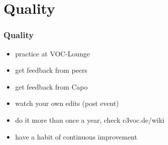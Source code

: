 \documentclass[hyperref={pdfpagelabels=false}]{beamer}
\begin{document}
\begin{frame}
\end{frame}

\section{Quality} 
\begin{frame}
\frametitle{Quality}
\begin{itemize}[<+->]
\item  practice at VOC-Lounge %
\item  get feedback from peers %
\item  get feedback from Capo %
\item  watch your own edits (post event) %
\item  do it more than once a year, check c3voc.de/wiki %
\item  have a habit of continuous improvement %
\end{itemize} 
\end{frame}
\end{document}
